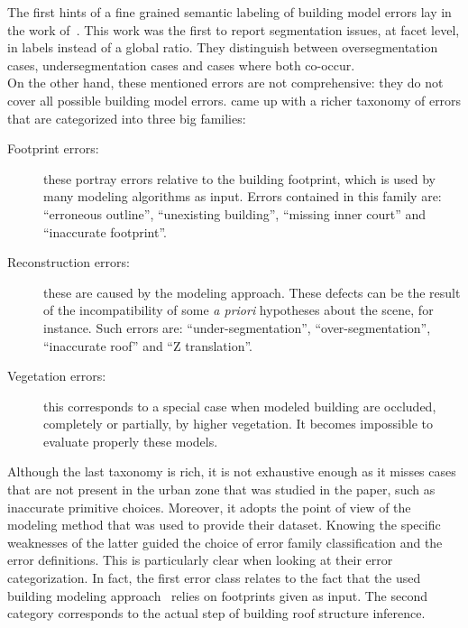             The first hints of a fine grained semantic labeling of building model errors lay in the work of~\textcite{rottensteiner2014results}.
            This work was the first to report segmentation issues, at facet level, in labels instead of a global ratio.
            They distinguish between oversegmentation cases, undersegmentation cases and cases where both co-occur.\\

            On the other hand, these mentioned errors are not comprehensive: they do not cover all possible building model errors.
            \textcite{michelin2013quality} came up with a richer taxonomy of errors that are categorized into three big families:
            \begin{description}
                \item[Footprint errors:] these portray errors relative to the building footprint, which is used by many modeling algorithms as input.
                        Errors contained in this family are: ``erroneous outline'', ``unexisting building'', ``missing inner court'' and ``inaccurate footprint''.
                \item[Reconstruction errors:] these are caused by the modeling approach.
                        These defects can be the result of the incompatibility of some \textit{a priori} hypotheses about the scene, for instance.
                        Such errors are: ``under-segmentation'', ``over-segmentation'', ``inaccurate roof'' and ``Z translation''.
                \item[Vegetation errors:] this corresponds to a special case when modeled building are occluded, completely or partially, by higher vegetation.
                        It becomes impossible to evaluate properly these models.
            \end{description}
            Although the last taxonomy is rich, it is not exhaustive enough as it misses cases that are not present in the urban zone that was studied in the paper, such as inaccurate primitive choices.
            Moreover, it adopts the point of view of the modeling method that was used to provide their dataset.
            Knowing the specific weaknesses of the latter guided the choice of error family classification and the error definitions.
            This is particularly clear when looking at their error categorization.
            In fact, the first error class relates to the fact that the used building modeling approach~\parencite{durupt2006automatic} relies on footprints given as input.
            The second category corresponds to the actual step of building roof structure inference.


